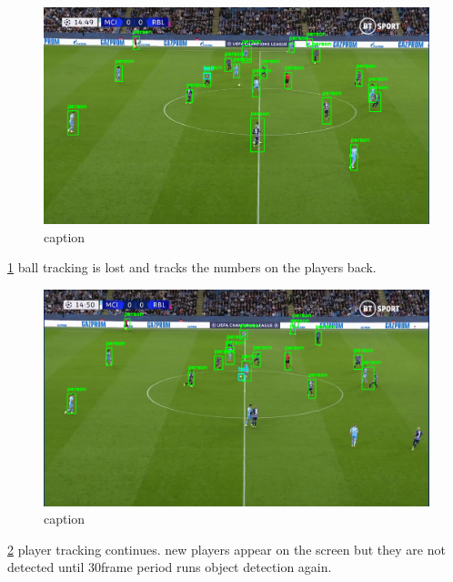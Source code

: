 \documentclass[
11pt,
twoside
]{report}
\begin{document}
\begin{figure}[H]
    \includegraphics[keepaspectratio, width=\columnwidth]{Screenshot_2022-03-03_21-35-39.png}
    \caption{caption}
    \label{img:3}
\end{figure}
\ref{img:3} ball tracking is lost and tracks the numbers on the players back.

\begin{figure}[H]
    \includegraphics[keepaspectratio, width=\columnwidth]{Screenshot_2022-03-03_21-36-05.png}
    \caption{caption}
    \label{img:4}
\end{figure}
\ref{img:4} player tracking continues. new players appear on the screen but they are not
detected until 30frame period runs object detection again.
\end{document}
